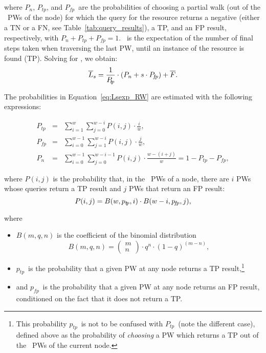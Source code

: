 \documentclass[]{elsarticle}
\newcommand{\pn} 	{\ensuremath{P_n}}
\newcommand{\ps} 	{\ensuremath{P_{\!t\!p}}}
\newcommand{\pf} 	{\ensuremath{P_{\!f\!p}}}
\newcommand{\ptp}       {\ensuremath{p_{t\!p}}}
\newcommand{\pfp}       {\ensuremath{p_{\!f\!p}}}
\begin{document}
\noindent
where \pn, \ps, and \pf\ are the probabilities of choosing a partial walk (out of the \w\ PWs of the node) for which the query for the resource returns a negative (either a TN or a FN, see Table~\ref{tab:query_results}), a TP, and an FP result, respectively, with $\pn+\ps+\pf=1$. \Texp\ is the expectation of the number of final steps taken when traversing the last PW, until an instance of the resource is found (TP).
Solving for \Lsexp, we obtain:
\begin{equation}
 \Lsexp = \frac{1}{\ps} \cdot (\pn + s\cdot\pf) + \Texp.
 \label{eq:Lsexp_RW}
\end{equation}

The probabilities in Equation~\ref{eq:Lsexp_RW} are estimated with the following expressions:

\begin{eqnarray}
  \ps \!\! & = \!\! & \sum_{i=1}^{w} \sum_{j=0}^{w-i} P(i,j)\cdot \frac{i}{w}, \nonumber \\
  \pf \!\! & = \!\! & \sum_{i=0}^{w-1} \sum_{j=1}^{w-i} P(i,j)\cdot \frac{j}{w}, \nonumber \\
  \pn \!\! & = \!\! & \sum_{i=0}^{w-1} \sum_{j=0}^{w-i-1} \!\! P(i,j)\cdot \frac{w-(i+j)}{w} = 1-\ps-\pf,
 \label{eq:RW_probs}
\end{eqnarray}

\noindent where $P(i,j)$ is the probability that, in the \w\ PWs of a node, there are $i$ PWs whose queries return a TP result and $j$ PWs that return an FP result:
\begin{equation}
 P(i,j) = B(\w,\ptp,i)\cdot B(\w-i,\pfp,j),
 \label{eq:Pij}
\end{equation}

\noindent
where 

\begin{itemize}
\item
$B(m,q,n)$ is the coefficient of the binomial distribution
\begin{equation}
B(m,q,n) = \left(\begin{array}{c} m\\ n \end{array}\right)\cdot q^n \cdot (1-q)^{(m-n)},
\end{equation}

\item
\ptp\ is the probability that a given PW at any node returns a TP result,\footnote{This probability \ptp\ is not to be confused with \ps\ (note the different case), defined above as the probability of \emph{choosing} a PW which returns a TP out of the \w\ PWs of the current node.}

\item
and  \pfp\ is the probability that a given PW at any node returns an FP result, conditioned on the fact that it does not return a TP. 

\end{itemize}
\end{document}
